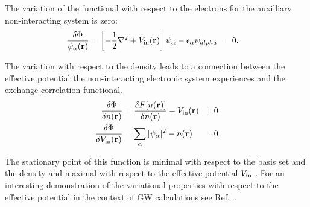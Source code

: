 The variation of the functional with respect to the electrons 
for the auxilliary non-interacting system is zero:
%
\begin{align}
 \frac{\delta \Phi}{\psi_{\alpha}({\bf r})} & = \left[-\frac{1}{2}\nabla^{2} + V_{\rm in}({\bf r}) \right]\psi_{\alpha} -\epsilon_{\alpha}\psi_{alpha}&=& 0.
\end{align}

The variation with respect to the density leads to a connection between the effective potential
the non-interacting electronic system experiences and the exchange-correlation functional.
%
\begin{align}
 \frac{\delta \Phi}{\delta n({\bf r})}  & =  \frac{\delta F[n({\bf r})]}{\delta n({\bf r})} - V_{\rm in}({\bf r}) &=& 0 \\
 \frac{\delta \Phi}{\delta V_{\rm in}({\bf r})} & = \sum_{\alpha}|\psi_{\alpha}|^{2} - n({\bf r}) &=& 0
\end{align}

The stationary point of this function is minimal with respect to the basis set and
the density and maximal with respect to the effective potential $V_{\rm in}$ \cite{methfessel95}.
For an interesting demonstration of the variational properties with respect to the 
effective potential in the context of GW calculations see Ref.~\cite{sohrab10}.

